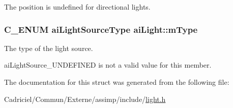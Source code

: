The position is undefined for directional lights. 
\subsubsection[{\texorpdfstring{m\+Type}{mType}}]{\setlength{\rightskip}{0pt plus 5cm}C\+\_\+\+E\+N\+UM {\bf ai\+Light\+Source\+Type} ai\+Light\+::m\+Type}\hypertarget{structai_light_a4cba1741875dd92724ff55be91c60c2b}{}\label{structai_light_a4cba1741875dd92724ff55be91c60c2b}
The type of the light source.

ai\+Light\+Source\+\_\+\+U\+N\+D\+E\+F\+I\+N\+ED is not a valid value for this member. 

The documentation for this struct was generated from the following file\+:\begin{DoxyCompactItemize}
\item 
Cadriciel/\+Commun/\+Externe/assimp/include/\hyperlink{light_8h}{light.\+h}\end{DoxyCompactItemize}

